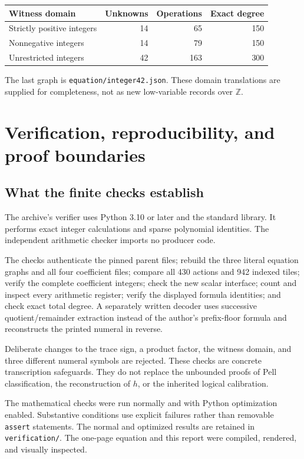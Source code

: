 \documentclass[11pt,letterpaper]{article}
\theoremstyle{definition}
\newcommand{\Z}{\mathbb Z}
\newcommand{\code}[1]{\texttt{\small #1}}
\begin{document}
\begin{center}
\begin{tabular}{lrrr}
\toprule
Witness domain & Unknowns & Operations & Exact degree\\
\midrule
Strictly positive integers &14&65&150\\
Nonnegative integers &14&79&150\\
Unrestricted integers &42&163&300\\
\bottomrule
\end{tabular}
\end{center}
The last graph is \code{equation/integer42.json}. These domain
translations are supplied for completeness, not as new low-variable
records over \(\Z\).

\section{Verification, reproducibility, and proof boundaries}
\label{sec:verification}

\subsection{What the finite checks establish}

The archive's verifier uses Python 3.10 or later and the standard library.
It performs exact integer calculations and sparse polynomial identities.
The independent arithmetic checker imports no producer code.

The checks authenticate the pinned parent files; rebuild the three
literal equation graphs and all four coefficient files; compare all
430 actions and 942 indexed tiles; verify the complete coefficient
integers; check the new scalar interface; count and inspect every
arithmetic register; verify the displayed formula identities; and
check exact total degree. A separately written decoder uses successive
quotient/remainder extraction instead of the author's prefix-floor
formula and reconstructs the printed numeral in reverse.

Deliberate changes to the trace sign, a product factor, the witness
domain, and three different numeral symbols are rejected. These checks
are concrete transcription safeguards. They do not replace the
unbounded proofs of Pell classification, the reconstruction of \(h\),
or the inherited logical calibration.

The mathematical checks were run normally and with Python optimization
enabled. Substantive conditions use explicit failures rather than
removable \code{assert} statements. The normal and optimized results
are retained in \code{verification/}. The one-page equation and this
report were compiled, rendered, and visually inspected.
\end{document}
